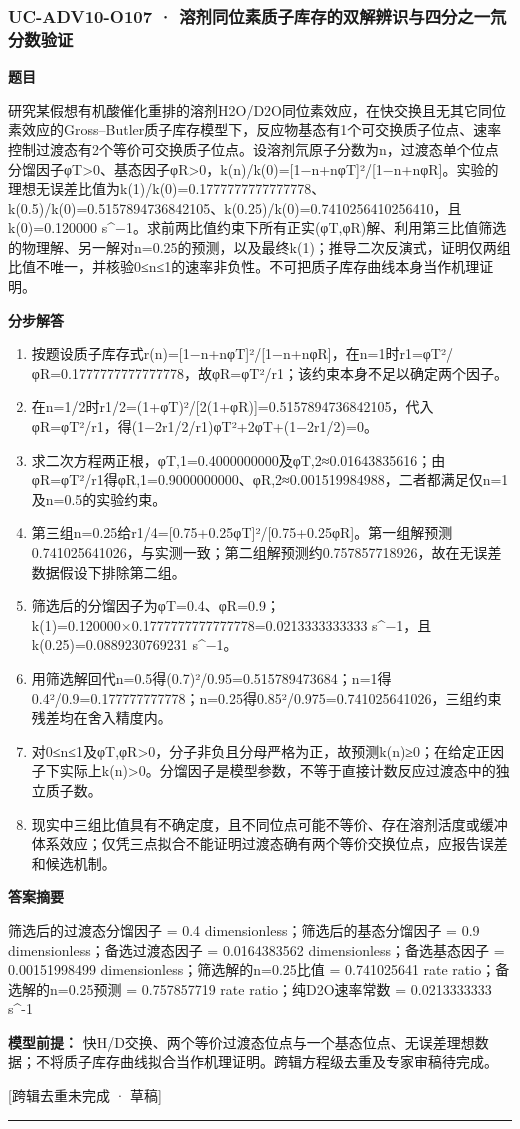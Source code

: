 \documentclass[UTF8,11pt,a4paper]{ctexart}
\begin{document}
\subsubsection*{UC-ADV10-O107 · 溶剂同位素质子库存的双解辨识与四分之一氘分数验证}
\noindent\textbf{题目}\par
研究某假想有机酸催化重排的溶剂H2O/D2O同位素效应，在快交换且无其它同位素效应的Gross–Butler质子库存模型下，反应物基态有1个可交换质子位点、速率控制过渡态有2个等价可交换质子位点。设溶剂氘原子分数为n，过渡态单个位点分馏因子φT>0、基态因子φR>0，k(n)/k(0)=[1−n+nφT]²/[1−n+nφR]。实验的理想无误差比值为k(1)/k(0)=0.1777777777777778、k(0.5)/k(0)=0.5157894736842105、k(0.25)/k(0)=0.7410256410256410，且k(0)=0.120000 s\textasciicircum{}−1。求前两比值约束下所有正实(φT,φR)解、利用第三比值筛选的物理解、另一解对n=0.25的预测，以及最终k(1)；推导二次反演式，证明仅两组比值不唯一，并核验0≤n≤1的速率非负性。不可把质子库存曲线本身当作机理证明。\par
\medskip\noindent\textbf{分步解答}
\begin{enumerate}
\item 按题设质子库存式r(n)=[1−n+nφT]²/[1−n+nφR]，在n=1时r1=φT²/φR=0.1777777777777778，故φR=φT²/r1；该约束本身不足以确定两个因子。
\item 在n=1/2时r1/2=(1+φT)²/[2(1+φR)]=0.5157894736842105，代入φR=φT²/r1，得(1−2r1/2/r1)φT²+2φT+(1−2r1/2)=0。
\item 求二次方程两正根，φT,1=0.4000000000及φT,2≈0.01643835616；由φR=φT²/r1得φR,1=0.9000000000、φR,2≈0.001519984988，二者都满足仅n=1及n=0.5的实验约束。
\item 第三组n=0.25给r1/4=[0.75+0.25φT]²/[0.75+0.25φR]。第一组解预测0.741025641026，与实测一致；第二组解预测约0.757857718926，故在无误差数据假设下排除第二组。
\item 筛选后的分馏因子为φT=0.4、φR=0.9；k(1)=0.120000×0.1777777777777778=0.0213333333333 s\textasciicircum{}−1，且k(0.25)=0.0889230769231 s\textasciicircum{}−1。
\item 用筛选解回代n=0.5得(0.7)²/0.95=0.515789473684；n=1得0.4²/0.9=0.177777777778；n=0.25得0.85²/0.975=0.741025641026，三组约束残差均在舍入精度内。
\item 对0≤n≤1及φT,φR>0，分子非负且分母严格为正，故预测k(n)≥0；在给定正因子下实际上k(n)>0。分馏因子是模型参数，不等于直接计数反应过渡态中的独立质子数。
\item 现实中三组比值具有不确定度，且不同位点可能不等价、存在溶剂活度或缓冲体系效应；仅凭三点拟合不能证明过渡态确有两个等价交换位点，应报告误差和候选机制。
\end{enumerate}
\noindent\textbf{答案摘要}\par
筛选后的过渡态分馏因子 = 0.4 dimensionless；筛选后的基态分馏因子 = 0.9 dimensionless；备选过渡态因子 = 0.0164383562 dimensionless；备选基态因子 = 0.00151998499 dimensionless；筛选解的n=0.25比值 = 0.741025641 rate ratio；备选解的n=0.25预测 = 0.757857719 rate ratio；纯D2O速率常数 = 0.0213333333 s\textasciicircum{}-1\par
\noindent\textbf{模型前提：}
快H/D交换、两个等价过渡态位点与一个基态位点、无误差理想数据；不将质子库存曲线拟合当作机理证明。跨辑方程级去重及专家审稿待完成。\par
\noindent\textcolor{red!65!black}{[跨辑去重未完成 · 草稿]} \par
\medskip\hrule\medskip
{}
\end{document}

